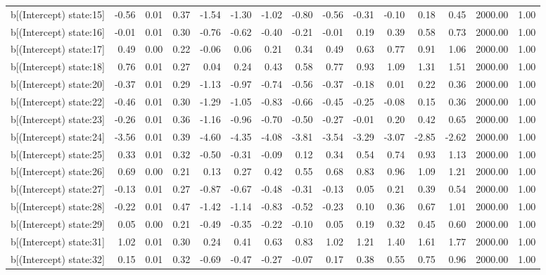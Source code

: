 \begin{table}[ht]
\begin{tabular}{rrrrrrrrrrrrrrr}
  b[(Intercept) state:15] & -0.56 & 0.01 & 0.37 & -1.54 & -1.30 & -1.02 & -0.80 & -0.56 & -0.31 & -0.10 & 0.18 & 0.45 & 2000.00 & 1.00 \\ 
  b[(Intercept) state:16] & -0.01 & 0.01 & 0.30 & -0.76 & -0.62 & -0.40 & -0.21 & -0.01 & 0.19 & 0.39 & 0.58 & 0.73 & 2000.00 & 1.00 \\ 
  b[(Intercept) state:17] & 0.49 & 0.00 & 0.22 & -0.06 & 0.06 & 0.21 & 0.34 & 0.49 & 0.63 & 0.77 & 0.91 & 1.06 & 2000.00 & 1.00 \\ 
  b[(Intercept) state:18] & 0.76 & 0.01 & 0.27 & 0.04 & 0.24 & 0.43 & 0.58 & 0.77 & 0.93 & 1.09 & 1.31 & 1.51 & 2000.00 & 1.00 \\ 
  b[(Intercept) state:20] & -0.37 & 0.01 & 0.29 & -1.13 & -0.97 & -0.74 & -0.56 & -0.37 & -0.18 & 0.01 & 0.22 & 0.36 & 2000.00 & 1.00 \\ 
  b[(Intercept) state:22] & -0.46 & 0.01 & 0.30 & -1.29 & -1.05 & -0.83 & -0.66 & -0.45 & -0.25 & -0.08 & 0.15 & 0.36 & 2000.00 & 1.00 \\ 
  b[(Intercept) state:23] & -0.26 & 0.01 & 0.36 & -1.16 & -0.96 & -0.70 & -0.50 & -0.27 & -0.01 & 0.20 & 0.42 & 0.65 & 2000.00 & 1.00 \\ 
  b[(Intercept) state:24] & -3.56 & 0.01 & 0.39 & -4.60 & -4.35 & -4.08 & -3.81 & -3.54 & -3.29 & -3.07 & -2.85 & -2.62 & 2000.00 & 1.00 \\ 
  b[(Intercept) state:25] & 0.33 & 0.01 & 0.32 & -0.50 & -0.31 & -0.09 & 0.12 & 0.34 & 0.54 & 0.74 & 0.93 & 1.13 & 2000.00 & 1.00 \\ 
  b[(Intercept) state:26] & 0.69 & 0.00 & 0.21 & 0.13 & 0.27 & 0.42 & 0.55 & 0.68 & 0.83 & 0.96 & 1.09 & 1.21 & 2000.00 & 1.00 \\ 
  b[(Intercept) state:27] & -0.13 & 0.01 & 0.27 & -0.87 & -0.67 & -0.48 & -0.31 & -0.13 & 0.05 & 0.21 & 0.39 & 0.54 & 2000.00 & 1.00 \\ 
  b[(Intercept) state:28] & -0.22 & 0.01 & 0.47 & -1.42 & -1.14 & -0.83 & -0.52 & -0.23 & 0.10 & 0.36 & 0.67 & 1.01 & 2000.00 & 1.00 \\ 
  b[(Intercept) state:29] & 0.05 & 0.00 & 0.21 & -0.49 & -0.35 & -0.22 & -0.10 & 0.05 & 0.19 & 0.32 & 0.45 & 0.60 & 2000.00 & 1.00 \\ 
  b[(Intercept) state:31] & 1.02 & 0.01 & 0.30 & 0.24 & 0.41 & 0.63 & 0.83 & 1.02 & 1.21 & 1.40 & 1.61 & 1.77 & 2000.00 & 1.00 \\ 
  b[(Intercept) state:32] & 0.15 & 0.01 & 0.32 & -0.69 & -0.47 & -0.27 & -0.07 & 0.17 & 0.38 & 0.55 & 0.75 & 0.96 & 2000.00 & 1.00 \\ 

\end{tabular}
\end{table}
